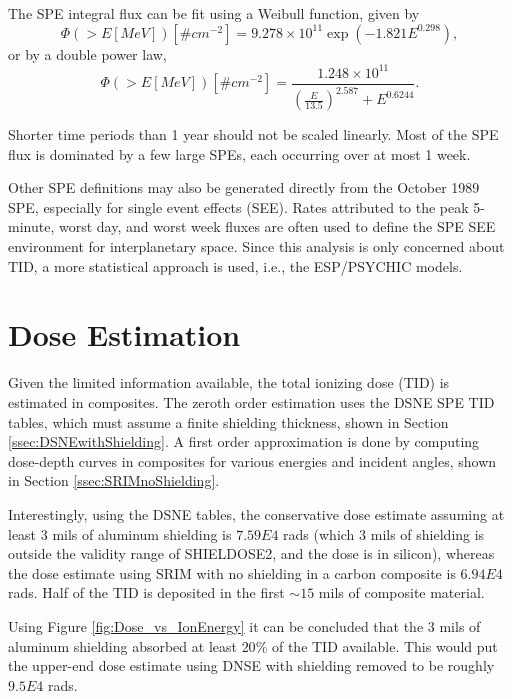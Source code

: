 \documentclass{hitec}
\begin{document}
The SPE integral flux can be fit using a Weibull function, given by
\begin{equation}
\Phi(>E[MeV]) [\# cm^{-2}] = 9.278\times 10^{11} \exp\left(-1.821E^{0.298}\right),
\end{equation}
or by a double power law,
\begin{equation}
\Phi(>E[MeV]) [\# cm^{-2}] = \frac{1.248\times 10^{11}}{\left(\frac{E}{13.5}\right)^{2.587} + E^{0.6244}}.
\end{equation}

Shorter time periods than 1 year should not be scaled linearly. Most of the SPE flux is dominated by a few large SPEs, each occurring over at most 1 week.

Other SPE definitions may also be generated directly from the October 1989 SPE, especially for single event effects (SEE). Rates attributed to the peak 5-minute, worst day, and worst week fluxes are often used to define the SPE SEE environment for interplanetary space. Since this analysis is only concerned about TID, a more statistical approach is used, i.e., the ESP/PSYCHIC models.

\section{Dose Estimation}

Given the limited information available, the total ionizing dose (TID) is estimated in composites. The zeroth order estimation uses the DSNE SPE TID tables, which must assume a finite shielding thickness, shown in Section \ref{ssec:DSNEwithShielding}. A first order approximation is done by computing dose-depth curves in composites for various energies and incident angles, shown in Section \ref{ssec:SRIMnoShielding}.

Interestingly, using the DSNE tables, the conservative dose estimate assuming at least 3 mils of aluminum shielding is $7.59E4$ rads (which $3$ mils of shielding is outside the validity range of SHIELDOSE2, and the dose is in silicon), whereas the dose estimate using SRIM with no shielding in a carbon composite is $6.94E4$ rads. Half of the TID is deposited in the first $\sim15$ mils of composite material.

Using Figure \ref{fig:Dose_vs_IonEnergy} it can be concluded that the $3$ mils of aluminum shielding absorbed at least $20\%$ of the TID available. This would put the upper-end dose estimate using DNSE with shielding removed to be roughly $9.5E4$ rads.
\end{document}
